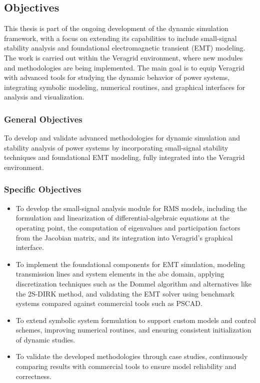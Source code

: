 \subsection{Objectives}

This thesis is part of the ongoing development of the dynamic simulation framework, 
with a focus on extending its capabilities to include small-signal stability analysis and foundational electromagnetic transient (EMT) modeling. 
The work is carried out within the Veragrid environment, where new modules and methodologies are being implemented. 
The main goal is to equip Veragrid with advanced tools for studying the dynamic behavior of power systems, integrating symbolic modeling, numerical routines,
and graphical interfaces for analysis and visualization.

\subsubsection*{General Objectives}

To develop and validate advanced methodologies for dynamic simulation and stability analysis of power systems by incorporating small-signal stability techniques and foundational EMT modeling, fully integrated into the Veragrid environment.

\subsubsection*{Specific Objectives}

\begin{itemize}
    \item To develop the small-signal analysis module for RMS models, including the formulation and linearization of differential-algebraic equations at the operating point, the computation of eigenvalues and participation factors from the Jacobian matrix, and its integration into Veragrid’s graphical interface.
    \item To implement the foundational components for EMT simulation, modeling transmission lines and system elements in the abc domain, applying discretization techniques such as the Dommel algorithm and alternatives like the 2S-DIRK method, and validating the EMT solver using benchmark systems compared against commercial tools such as PSCAD.
    \item To extend symbolic system formulation to support custom models and control schemes, improving numerical routines, and ensuring consistent initialization of dynamic studies.
    \item To validate the developed methodologies through case studies, continuously comparing results with commercial tools to ensure model reliability and correctness.
\end{itemize}




